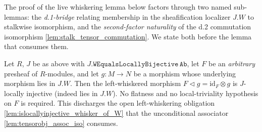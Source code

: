 The proof of the live whiskering lemma below factors through two named
sub-lemmas: the \emph{d.1-bridge} relating membership in the sheafification
localizer \(J.W\) to stalkwise isomorphism, and the \emph{second-factor
naturality} of the d.2 commutation isomorphism \cref{lem:stalk_tensor_commutation}.
We state both before the lemma that consumes them.

\begin{lemma}

  \label{lem:islocallyinjective_whiskerleft_via_stalk}
  Let \(R\), \(J\) be as above with \(J.\mathtt{WEqualsLocallyBijective}\,\mathtt{Ab}\),
  let \(F\) be an \emph{arbitrary} presheaf of \(R\)-modules, and let \(g : M \to N\)
  be a morphism whose underlying morphism lies in \(J.W\). Then the left-whiskered
  morphism \(F \triangleleft g = \mathrm{id}_F \otimes g\) is \(J\)-locally injective
  (indeed lies in \(J.W\)). No flatness and no local-triviality hypothesis on \(F\) is
  required. This discharges the open left-whiskering obligation
  \cref{lem:islocallyinjective_whisker_of_W} that the unconditional associator
  \cref{lem:tensorobj_assoc_iso} consumes.
\end{lemma}

